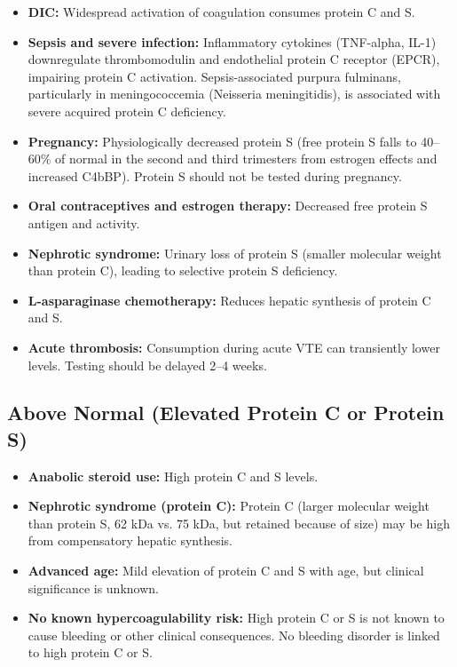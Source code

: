 \begin{itemize}
  \item \textbf{DIC:} Widespread activation of coagulation consumes protein C and S.
  \item \textbf{Sepsis and severe infection:} Inflammatory cytokines (TNF-alpha, IL-1) downregulate thrombomodulin and endothelial protein C receptor (EPCR), impairing protein C activation. Sepsis-associated purpura fulminans, particularly in meningococcemia (Neisseria meningitidis), is associated with severe acquired protein C deficiency.
  \item \textbf{Pregnancy:} Physiologically decreased protein S (free protein S falls to 40--60\% of normal in the second and third trimesters from estrogen effects and increased C4bBP). Protein S should not be tested during pregnancy.
  \item \textbf{Oral contraceptives and estrogen therapy:} Decreased free protein S antigen and activity.
  \item \textbf{Nephrotic syndrome:} Urinary loss of protein S (smaller molecular weight than protein C), leading to selective protein S deficiency.
  \item \textbf{L-asparaginase chemotherapy:} Reduces hepatic synthesis of protein C and S.
  \item \textbf{Acute thrombosis:} Consumption during acute VTE can transiently lower levels. Testing should be delayed 2--4 weeks.
\end{itemize}

\subsection*{Above Normal (Elevated Protein C or Protein S)}
\begin{itemize}
  \item \textbf{Anabolic steroid use:} High protein C and S levels.
  \item \textbf{Nephrotic syndrome (protein C):} Protein C (larger molecular weight than protein S, 62 kDa vs. 75 kDa, but retained because of size) may be high from compensatory hepatic synthesis.
  \item \textbf{Advanced age:} Mild elevation of protein C and S with age, but clinical significance is unknown.
  \item \textbf{No known hypercoagulability risk:} High protein C or S is not known to cause bleeding or other clinical consequences. No bleeding disorder is linked to high protein C or S.
\end{itemize}

